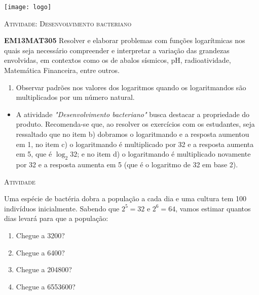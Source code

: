 \documentclass[10 pt,usenames,dvipsnames, oneside]{article}
\begin{document}
\begin{center}
  \begin{minipage}[l]{3cm}
\texttt{[image: logo]}    
\end{minipage}\hfill
\begin{minipage}[r]{.8\textwidth}
 {\Large \scshape Atividade: Desenvolvimento bacteriano}  
\end{minipage}
\end{center}
\vspace{.2cm}

\ifdefined\prof
\begin{objetivos}
\item \textbf{EM13MAT305} Resolver e elaborar problemas com funções logarítmicas nos quais seja necessário compreender e interpretar a variação das grandezas envolvidas, em contextos como os de abalos sísmicos, pH, radioatividade, Matemática Financeira, entre outros.
\end{objetivos}

\begin{goals}
\begin{enumerate}
\item Observar padrões nos valores dos logaritmos quando os logaritmandos são multiplicados por um número natural.
\end{enumerate}

\tcblower

\begin{itemize}
\item  A atividade \textit{"Desenvolvimento bacteriano"} busca destacar a propriedade do produto. Recomenda-se que, ao resolver os exercícios com os estudantes, seja ressaltado que no item b) dobramos o logaritmando e a resposta aumentou em 1, no item c) o logaritmando é multiplicado por 32 e a resposta aumenta em 5, que é $\log_2 32$; e no item d) o logaritmando é multiplicado novamente por 32 e a resposta aumenta em 5 (que é o logaritmo de 32 em base 2).
\end{itemize}
\end{goals}

\bigskip
\begin{center}
{\large \scshape Atividade}
\end{center}
\fi

Uma espécie de bactéria dobra a população a cada dia e uma cultura tem 100 indivíduos inicialmente. Sabendo que $2^5=32$ e $2^6=64$, vamos estimar quantos dias levará para que a população: 
\begin{enumerate}
\item Chegue a 3200?
\item Chegue a 6400?
\item Chegue a 204800?
\item Chegue a 6553600?
\end{enumerate}
\end{document}
